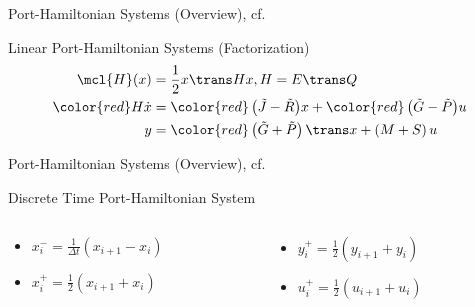 \begin{frame}{Port-Hamiltonian Systems (Overview), cf.~\cite{Morandin2022}}
    \begin{block}{Linear Port-Hamiltonian Systems (Factorization)}
        \begin{align*}
            \mcl{H}(x) &= \frac{1}{2} x\trans H x, H = E\trans Q \\
            {\color{red}H} \dot{x} &= {\color{red}\left( \tilde{J} - \tilde{R} \right)} x + {\color{red}\left( \tilde{G} - \tilde{P} \right)} u \\
            y &= {\color{red}\left( \tilde{G} + \tilde{P} \right)\trans} x + \left( M + S \right) u
        \end{align*}
    \end{block}
\end{frame}

\begin{frame}{Port-Hamiltonian Systems (Overview), cf.~\cite{Morandin2022}}
    \begin{block}{Discrete Time Port-Hamiltonian System}
    \end{block}

    \begin{columns}
        \begin{column}{.27\textwidth}
            \begin{itemize}
                \item $x_i^- = \frac{1}{\Delta t} (x_{i + 1} - x_i)$
                \item $x_i^+ = \frac{1}{2} (x_{i + 1} + x_i)$
            \end{itemize}
        \end{column}
        \begin{column}{.27\textwidth}
            \begin{itemize}
                \item $y_i^+ = \frac{1}{2} (y_{i + 1} + y_i)$
                \item $u_i^+ = \frac{1}{2} (u_{i + 1} + u_i)$
            \end{itemize}
        \end{column}
    \end{columns}
\end{frame}